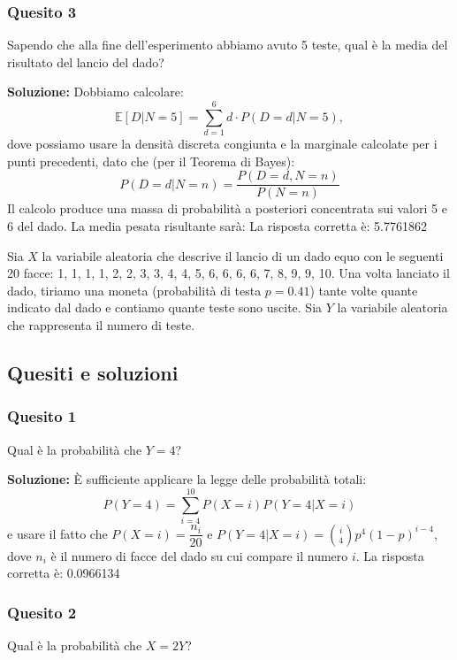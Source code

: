 \documentclass[12pt, a4paper]{article}
\begin{document}
\subsubsection*{Quesito 3}
Sapendo che alla fine dell’esperimento abbiamo avuto 5 teste, qual è la media del risultato del lancio del dado?

\textbf{Soluzione:}
Dobbiamo calcolare:
$$ \mathbb{E}[D|N=5] = \sum_{d=1}^6 d \cdot P(D=d|N=5), $$
dove possiamo usare la densità discreta congiunta e la marginale calcolate per i punti precedenti, dato che (per il Teorema di Bayes):
$$ P(D=d|N=n) = \frac{P(D=d,N=n)}{P(N=n)} $$
Il calcolo produce una massa di probabilità a posteriori concentrata sui valori 5 e 6 del dado. La media pesata risultante sarà:
La risposta corretta è: 5.7761862


\vspace{0.5cm}
\begin{tcolorbox}[colback=lightergray!10, colframe=tocsec, title=\textbf{Esercizio 6}]
Sia $X$ la variabile aleatoria che descrive il lancio di un dado equo con le seguenti 20 facce: 1, 1, 1, 1, 2, 2, 3, 3, 4, 4, 5, 6, 6, 6, 6, 7, 8, 9, 9, 10. Una volta lanciato il dado, tiriamo una moneta (probabilità di testa $p=0.41$) tante volte quante indicato dal dado e contiamo quante teste sono uscite. Sia $Y$ la variabile aleatoria che rappresenta il numero di teste.
\end{tcolorbox}

\subsection*{Quesiti e soluzioni}

\subsubsection*{Quesito 1}
Qual è la probabilità che $Y=4$?

\textbf{Soluzione:}
È sufficiente applicare la legge delle probabilità totali: 
$$ P(Y=4) = \sum_{i=4}^{10} P(X=i)P(Y=4|X=i) $$
e usare il fatto che $P(X=i) = \dfrac{n_i}{20}$ e $P(Y=4|X=i) = \binom{i}{4} p^4 (1-p)^{i-4}$, dove $n_i$ è il numero di facce del dado su cui compare il numero $i$.
La risposta corretta è: 0.0966134

\subsubsection*{Quesito 2}
Qual è la probabilità che $X=2Y$?
\end{document}
